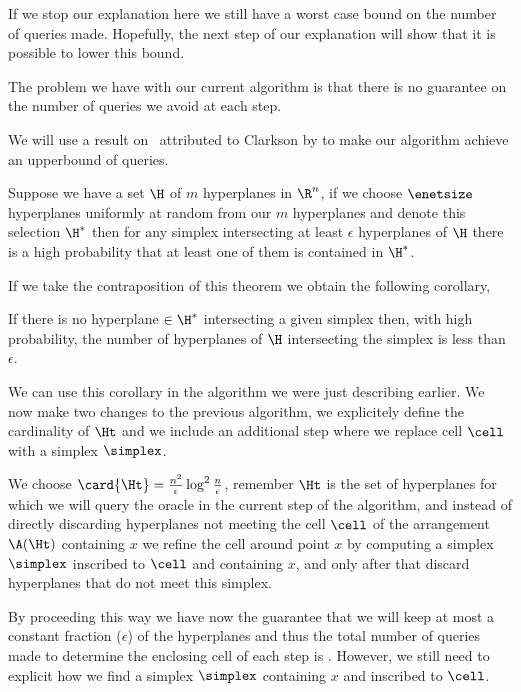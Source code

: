 If we stop our explanation here we still have a worst case 
bound on the number of queries made. Hopefully, the next step of our
explanation will show that it is possible to lower this bound.

The problem we have with our current algorithm is that there is no guarantee
on the number of queries we avoid at each step.

We will use a result on \enets~attributed to Clarkson by \cite{burgisser:2010}
to make our algorithm achieve an upperbound of 
queries.

\begin{theorem}[Clarkson]
Suppose we have a set $\H$ of $m$ hyperplanes in $\R^n$, if we choose
$\enetsize$ hyperplanes uniformly at
random from our $m$ hyperplanes and denote this selection $\H^{*}$ then for
any simplex intersecting at least $\epsilon$ hyperplanes of $\H$ there is a
high probability that at least one of them is contained in $\H^{*}$.
\end{theorem}

If we take the contraposition of this theorem we obtain the following
corollary,

\begin{corollary}
If there is no hyperplane $\in \H^{*}$ intersecting a given simplex then, with
high probability, the number of hyperplanes of $\H$ intersecting the simplex
is less than $\epsilon$.
\end{corollary}

We can use this corollary in the algorithm we were just describing earlier. We
now make two changes to the previous algorithm, we explicitely define the
cardinality of $\Ht$ and we include an additional step where we replace cell
$\cell$ with a simplex $\simplex$.

We choose $\card{\Ht} = \frac{n^2}{\epsilon} \log^2 \frac{n}{\epsilon}$,
remember $\Ht$ is the set of hyperplanes for which we will query the oracle in
the current step of the algorithm, and instead of directly discarding
hyperplanes not meeting the cell $\cell$ of the arrangement $\A(\Ht)$ containing $x$ we
refine the cell around point $x$ by computing a simplex $\simplex$ inscribed
to $\cell$ and containing $x$, and only after that discard hyperplanes that do
not meet this simplex.

By proceeding this way we have now the guarantee that we will keep at most a
constant fraction ($\epsilon$) of the hyperplanes and thus the total number of
queries made to determine the enclosing cell of
each step is . However, we
still need to explicit how we find a simplex $\simplex$ containing $x$ and
inscribed to $\cell$.

